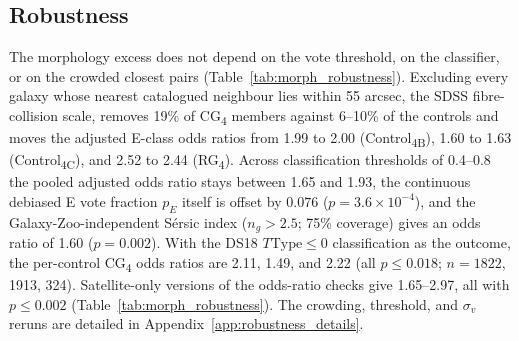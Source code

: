 \documentclass{aa}
\newcommand{\CB}{Control\textsubscript{4B}}
\newcommand{\CC}{Control\textsubscript{4C}}
\newcommand{\CG}{CG\textsubscript{4}}
\newcommand{\RG}{RG\textsubscript{4}}
\begin{document}
\subsection{Robustness}\label{sec:robustness}







The morphology excess does not depend on the vote threshold, on the classifier, or on the crowded closest pairs (Table~\ref{tab:morph_robustness}). Excluding every galaxy whose nearest catalogued neighbour lies within 55 arcsec, the SDSS fibre-collision scale, removes 19\% of \CG{} members against 6--10\% of the controls and moves the adjusted E-class odds ratios from 1.99 to 2.00 (\CB{}), 1.60 to 1.63 (\CC{}), and 2.52 to 2.44 (\RG{}). Across classification thresholds of 0.4--0.8 the pooled adjusted odds ratio stays between 1.65 and 1.93, the continuous debiased E vote fraction \(p_E\) itself is offset by \(0.076\) (\(p = 3.6\times 10^{-4}\)), and the Galaxy-Zoo-independent S\'ersic index (\(n_g > 2.5\); 75\% coverage) gives an odds ratio of 1.60 (\(p = 0.002\)). With the DS18 \(T\mathrm{Type}\leq0\) classification as the outcome, the per-control \CG{} odds ratios are 2.11, 1.49, and 2.22 (all \(p \leq 0.018\); \(n = 1822\), 1913, 324). Satellite-only versions of the odds-ratio checks give 1.65--2.97, all with \(p\leq 0.002\) (Table~\ref{tab:morph_robustness}). The crowding, threshold, and \(\sigma_v\) reruns are detailed in Appendix~\ref{app:robustness_details}.
\end{document}
